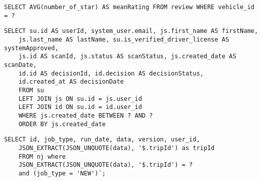 \begin{lstlisting}[caption={SQL Query example}]
SELECT AVG(number_of_star) AS meanRating FROM review WHERE vehicle_id = ?
\end{lstlisting}

\begin{lstlisting}[caption={SQL Query example verification}]
SELECT su.id AS userId, system_user.email, js.first_name AS firstName,
    js.last_name AS lastName, su.is_verified_driver_license AS systemApproved,
    js.id AS scanId, js.status AS scanStatus, js.created_date AS scanDate,
    id.id AS decisionId, id.decision AS decisionStatus,
    id.created_at AS decisionDate
    FROM su
    LEFT JOIN js ON su.id = js.user_id
    LEFT JOIN id ON su.id = id.user_id
    WHERE js.created_date BETWEEN ? AND ?
    ORDER BY js.created_date
\end{lstlisting}

\begin{lstlisting}[caption={SQL query to get entry from json data}]
SELECT id, job_type, run_date, data, version, user_id,
    JSON_EXTRACT(JSON_UNQUOTE(data), '$.tripId') as tripId
    FROM nj where
    JSON_EXTRACT(JSON_UNQUOTE(data), '$.tripId') = ?
    and (job_type = 'NEW')`;
\end{lstlisting}
